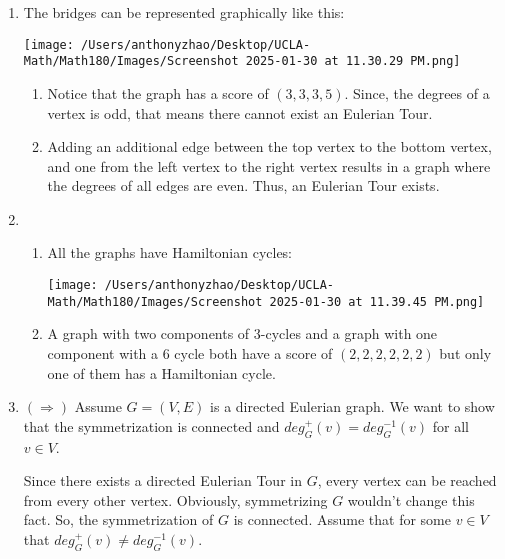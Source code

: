\documentclass[12pt]{article}
\begin{document}

\begin{enumerate}[start=1,label={\bfseries Problem \arabic*:},leftmargin=1in] %
    \item The bridges can be represented graphically like this:
    
    \texttt{[image: /Users/anthonyzhao/Desktop/UCLA-Math/Math180/Images/Screenshot 2025-01-30 at 11.30.29 PM.png]}
    
    \begin{enumerate}
        \item Notice that the graph has a score of $(3,3, 3, 5)$. Since, the degrees of a vertex is odd, that means there cannot exist an Eulerian Tour.
        \item Adding an additional edge between the top vertex to the bottom vertex, and one from the left vertex to the right vertex results in a graph where the degrees of all edges are even. Thus, an Eulerian Tour exists.
    \end{enumerate}

    \item  \begin{enumerate}
        \item All the graphs have Hamiltonian cycles:

        \texttt{[image: /Users/anthonyzhao/Desktop/UCLA-Math/Math180/Images/Screenshot 2025-01-30 at 11.39.45 PM.png]}
        \item A graph with two components of 3-cycles and a graph with one component with a 6 cycle both have a score of $(2, 2, 2, 2, 2, 2)$ but only one of them has a Hamiltonian cycle. 
    \end{enumerate}

    \item $(\Rightarrow)$ Assume $G = (V, E)$ is a directed Eulerian graph. We want to show that the symmetrization is connected and $deg_{G}^{+}(v) = deg_{G}^{-1}(v)$ for all $v \in V$. 
    
    Since there exists a directed Eulerian Tour in $G$, every vertex can be reached from every other vertex. Obviously, symmetrizing $G$ wouldn't change this fact. So, the symmetrization of $G$ is connected. 
    Assume that for some $v \in V$ that $deg_{G}^{+}(v) \neq deg_{G}^{-1}(v)$. 


\end{enumerate}
\end{document}
